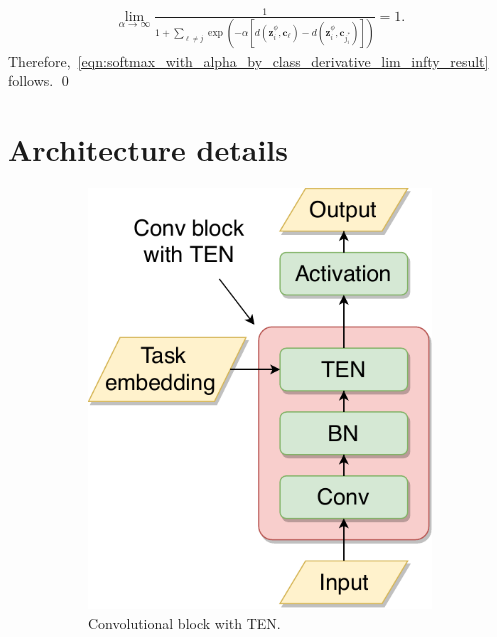 \documentclass{article}
\renewcommand{\vec}[1]{\mathbf{#1}}
\newcommand{\metric}{d}
\begin{document}
\begin{align} 
\lim_{\alpha \to \infty} \frac{1}{1 + \sum_{\ell \neq j}  \exp(-\alpha [\metric(\vec{z}_i^{\phi}, \vec{c}_\ell) - \metric(\vec{z}_i^{\phi}, \vec{c}_{j_{i}^*})])} = 1. \nonumber
\end{align}
Therefore,~\eqref{eqn:softmax_with_alpha_by_class_derivative_lim_infty_result} follows. \qed


\section{Architecture details} \label{ssec:components_of_architecture}

\begin{figure}[h]
    \centering
    \begin{subfigure}[t]{0.35\textwidth}
        \centering
        \includegraphics[width=\textwidth]{conv_block.pdf}
        \caption{Convolutional block with TEN.}
        \label{fig:conv_block}
    \end{subfigure} \hspace{0.15\textwidth}
    \begin{subfigure}[t]{0.3\textwidth}

\end{subfigure}
\end{figure}
\end{document}
